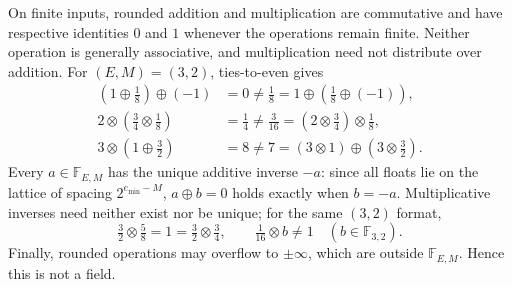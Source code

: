 \begin{remark}
On finite inputs, rounded addition and multiplication are
commutative and have respective identities $0$ and $1$ whenever
the operations remain finite. Neither operation is generally
associative, and multiplication need not distribute over addition.
For $(E, M)=(3, 2)$, ties-to-even gives
\[
 \begin{aligned}
 (1\oplus\tfrac18)\oplus(-1)&=0
   \ne\tfrac18=1\oplus(\tfrac18\oplus(-1)), \\
 2\otimes(\tfrac34\otimes\tfrac18)&=\tfrac14
   \ne\tfrac3{16}=(2\otimes\tfrac34)\otimes\tfrac18, \\
 3\otimes(1\oplus\tfrac32)&=8
   \ne7=(3\otimes1)\oplus(3\otimes\tfrac32).
 \end{aligned}
\]
Every $a\in\mathbb F_{E, M}$ has the unique additive inverse
$-a$: since all floats lie on the lattice of spacing
$2^{e_{\min}-M}$, $a\oplus b=0$ holds exactly when $b=-a$.
Multiplicative inverses need neither exist nor be unique;
for the same $(3, 2)$ format,
\[
 \tfrac32\otimes\tfrac58=1=\tfrac32\otimes\tfrac34,
 \qquad
 \tfrac1{16}\otimes b\ne1\quad(b\in\mathbb F_{3, 2}).
\]
Finally, rounded operations may overflow to $\pm\infty$,
which are outside $\mathbb F_{E, M}$. Hence this is not a field.
\end{remark}
